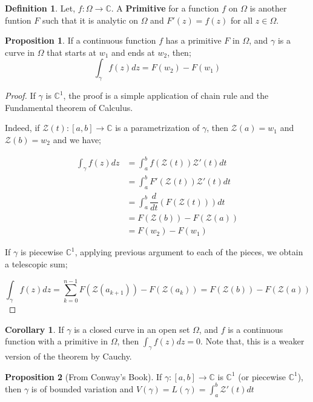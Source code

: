 \documentclass[12pt]{article}
\newcommand{\C}{\mathbb{C}}
\newcommand{\zcal}{\mathcal{Z}}
\theoremstyle{definition}
\newtheorem{cor}{Corollary}
\newtheorem{defn}{Definition}
\newtheorem{prop}{Proposition}
\newenvironment{definition}{
\begin{tcolorbox}[colback=green!5!white,colframe=green!75!black, parbox = false]\begin{defn} }{\end{defn}\end{tcolorbox} }
\newenvironment{proposition}{
\begin{tcolorbox}[colback=green!5!white,colframe=green!75!black, parbox = false]\begin{prop} }{\end{prop}\end{tcolorbox} }
\newenvironment{corollary}{
\begin{tcolorbox}[colback=blue!5!white,colframe=blue!75!black, parbox = false]\begin{cor} }{\end{cor}\end{tcolorbox} }
\begin{document}
\begin{definition}
    Let, $f : \Omega \rightarrow \C$. A \textbf{Primitive} for a function $f$ on $\Omega$ is another funtion $F$ such that it is analytic on $\Omega$ and $F'(z) = f(z)$ for all $z \in \Omega$.
\end{definition}

\begin{proposition}
    If a continuous function $f$ has a primitive $F$ in $\Omega$, and $\gamma$ is a curve in $\Omega$ that starts at $w_1$ and ends at $w_2$, then;
    $$\int_{\gamma} f(z)dz = F(w_2) - F(w_1)$$
\end{proposition}

\begin{proof}
    If $\gamma$ is $\C^1$, the proof is a simple application of chain rule and the Fundamental theorem of Calculus.

    Indeed, if $\zcal(t) : [a, b] \rightarrow \C$ is a parametrization of $\gamma$, then $\zcal(a) = w_1$ and $\zcal(b) = w_2$ and we have;

    \begin{align*}
        \int_{\gamma} f(z)dz
        & = \int_{a}^{b} f(\zcal(t))\zcal'(t)dt\\
        & = \int_{a}^{b} F'(\zcal(t))\zcal'(t)dt\\
        & = \int_{a}^{b}  \dfrac{d}{dt} \left(F(\zcal(t))\right) dt\\
        & = F(\zcal(b)) - F(\zcal(a))\\
        & = F(w_2) - F(w_1)
    \end{align*}

    If $\gamma$ is piecewise $\C^1$, applying previous argument to each of the pieces, we obtain a telescopic sum;

    $$\int_{\gamma} f(z)dz = \sum_{k = 0}^{n - 1} F(\zcal(a_{k+1})) - F(\zcal(a_k)) = F(\zcal(b)) - F(\zcal(a))$$
\end{proof}

\begin{corollary}
    If $\gamma$ is a closed curve in an open set $\Omega$, and $f$ is a continuous function with a primitive in $\Omega$, then $\int_{\gamma} f(z)dz = 0$. Note that, this is a weaker version of the theorem by Cauchy.
    \label{cor:weak-cauchy}
\end{corollary}


\begin{proposition}[From Conway's Book]
    If $\gamma: [a, b] \rightarrow \C$ is $\C^1$ (or piecewise $\C^1$), then $\gamma$ is of bounded variation and $V(\gamma) = L(\gamma) = \int_{a}^{b} \zcal'(t)dt$
\end{proposition}
\end{document}
